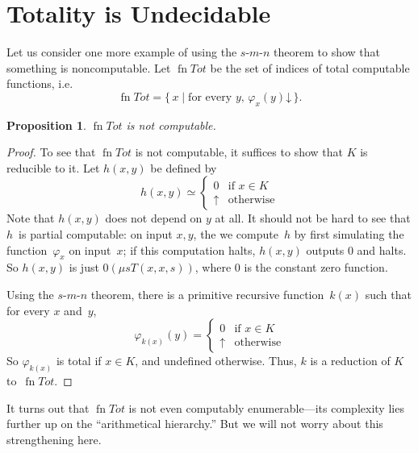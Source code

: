 \documentclass[10pt,a4paper]{article}
\theoremstyle{plain}
\newtheorem{prop}[thm]{Proposition}
\theoremstyle{definition}
\theoremstyle{remark}
\newenvironment{digress}{}{}
\newcommand*{\olfileid}[3]{}
\newcommand*{\olsection}[1]{\section*{#1}}
\newcommand*{\ollabel}[1]{\label{#1}}
\providecommand{\cfind}[1]{\varphi_{#1}}
\providecommand{\Zero}{\ensuremath{0}}
\providecommand{\fdefined}{\mathord{\downarrow}}
\providecommand{\Setabs}[2]{\{\, #1 \mid #2 \,\}}
\providecommand{\umin}{\mu}
\providecommand{\fundefined}{\mathord{\uparrow}}
\providecommand{\fn}{\operatorname{fn}}
\begin{document}



\olfileid{cmp}{thy}{tot}
\olsection{Totality is Undecidable}

Let us consider one more example of using the $s$-$m$-$n$ theorem to show
that something is noncomputable. Let $\fn{Tot}$ be the set of indices
of total computable functions, i.e.
\[
\fn{Tot} = \Setabs{x}{\text{for every $y$, $\cfind{x}(y)\fdefined$}}.
\]

\begin{prop}
\ollabel{prop:total}
$\fn{Tot}$ is not computable.
\end{prop}

\begin{proof}
To see that $\fn{Tot}$ is not computable, it suffices to show that $K$
is reducible to it. Let $h(x,y)$ be defined by
\[
h(x,y) \simeq
\begin{cases}
0 & \text{if $x \in K$} \\
\fundefined & \text{otherwise}
\end{cases}
\]
Note that $h(x,y)$ does not depend on $y$ at all. It should
not be hard to see that $h$~is partial computable: on input $x, y$, the
we compute~$h$ by first simulating the function~$\cfind{x}$ on input~$x$; if
this computation halts, $h(x,y)$ outputs $0$ and halts. So
$h(x,y)$ is just $\Zero(\umin{s}{T(x,x,s)})$, where $\Zero$ is the constant zero
function.

Using the $s$-$m$-$n$ theorem, there is a primitive recursive
function~$k(x)$ such that for every $x$ and~$y$,
\[
\cfind{k(x)}(y) =
\begin{cases}
0 & \text{if $x \in K$} \\
\fundefined & \text{otherwise}
\end{cases}
\]
So $\cfind{k(x)}$ is total if $x \in K$, and undefined otherwise. Thus,
$k$ is a reduction of $K$ to~$\fn{Tot}$.
\end{proof}

\begin{digress}
It turns out that $\fn{Tot}$ is not even computably enumerable---its
complexity lies further up on the ``arithmetical hierarchy.''  But we
will not worry about this strengthening here.
\end{digress}



\end{document}
